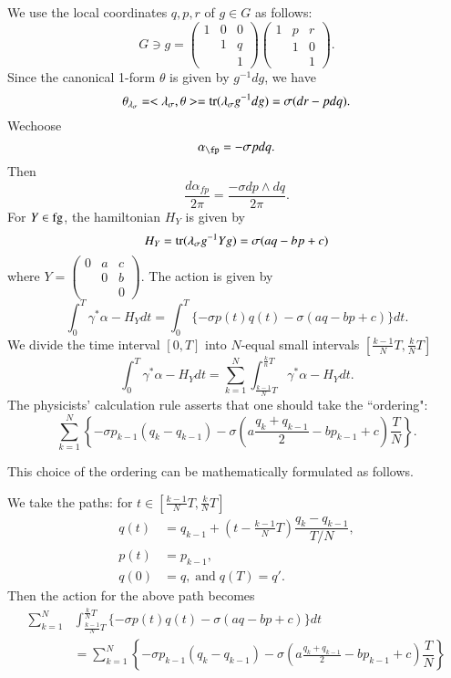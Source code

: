  We use the local coordinates $q, p,r $ of $g \in G$ as follows:
 $$
 G \ni g = \begin{pmatrix}
1 & 0 & 0\\
 & 1 & q\\
  & & 1
 \end{pmatrix}
\begin{pmatrix}
1 & p & r\\
 & 1 & 0\\
  & & 1
 \end{pmatrix}.
$$
Since the canonical 1-form $\theta$ is given by $g^{-1}dg$, we have
$$
\theta_{\lambda_{\sigma}}= < \lambda_{\sigma}, \theta> ={\rm tr}(\lambda_{\sigma} g^{-1}dg)= \sigma(dr-pdq).
$$
We\pageoriginale choose
$$
\alpha_{\fp}= -\sigma pdq.
$$
Then
$$
\dfrac{d\alpha_{fp}}{2 \pi} = \dfrac{-\sigma dp \wedge dq}{2\pi}.
$$
For $Y \in \operatorname{fg}$, the hamiltonian $H_{Y}$ is given by
$$
H_{Y} = {\rm tr}(\lambda_{\sigma} g^{-1} Y g)= \sigma(aq-bp + c)
$$
where $Y = \begin{pmatrix}
0 & a & c\\
  & 0 & b\\
  &   & 0
\end{pmatrix}.
$ The action is given by
$$
\int_{0}^{T}\gamma^{*}\alpha-H_{Y}dt = \int_{0}^{T}\{-\sigma p(t)q(t)-\sigma(aq-bp + c)\}dt.
$$
We divide the time interval $[0,T]$ into $N$-equal small intervals $\left[\frac{k-1}{N}T,  \frac{k}{N}T\right]$
$$
\int_{0}^{T} \gamma^{*}\alpha-H_{Y}dt = \sum\limits_{k=1}^{N}\int_{\frac{k-1}{N}T}^{\frac{k}{n}T} \gamma^{*}\alpha-H_{Y}dt.
$$
The physicists' calculation rule asserts that one should take the ``ordering":
$$
\sum\limits_{k=1}^{N}\left\{-\sigma p_{k-1}(q_{k}-q_{k-1})-\sigma(a \frac{q_{k}+q_{k-1}}{2}-bp_{k-1} + c)\frac{T}{N} \right\}.
$$

This choice of the ordering can be mathematically formulated as follows.

We take the paths: for $t \in \left[\frac{k-1}{N}T, \frac{k}{N}T\right]$
\begin{align*}
q(t)&=q_{k-1}+(t-\frac{k-1}{N}T)\dfrac{q_{k}-q_{k-1}}{T/N},\\
p(t)&= p_{k-1},\\
q(0)&= q, \; \text{and} \; q(T)=q'.
\end{align*}
Then the action for the above path becomes
\begin{equation*}
\begin{split}
\sum\limits_{k=1}^{N}&\int_{\frac{k-1}{N}T}^{\frac{k}{N}T} \{-\sigma p(t)q(t)-\sigma(aq-bp +c)\}dt\\
  &= \sum\limits_{k=1}^{N}\left\{-\sigma p_{k-1}(q_{k}-q_{k-1})-\sigma(a \frac{q_{k}+q_{k-1}}{2}-bp_{k-1}+c)\dfrac{T}{N} \right\}
\end{split}
\end{equation*}

